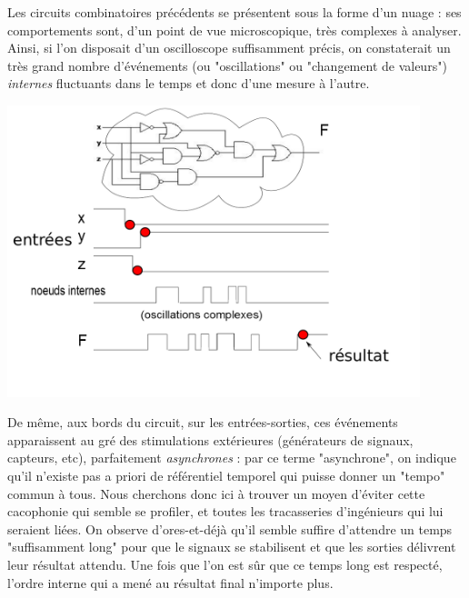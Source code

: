 Les circuits combinatoires précédents se présentent sous la forme d'un nuage : ses comportements sont, d'un point de vue microscopique, très complexes à analyser. Ainsi, si l'on
disposait d'un oscilloscope suffisamment précis, on constaterait un très grand nombre d'événements (ou "oscillations" ou "changement de valeurs") {\it internes} fluctuants dans le temps et donc d'une mesure à l'autre.
\begin{center}
  \includegraphics[width=12cm]{./figures/cloud-complexe-events.png}
\end{center}


De même, aux bords du circuit, sur les entrées-sorties, ces événements apparaissent au gré des stimulations extérieures (générateurs de signaux, capteurs, etc), parfaitement {\it asynchrones} : par ce terme
"asynchrone", on indique qu'il n'existe pas a priori de référentiel temporel qui puisse donner un "tempo" commun à tous.
Nous cherchons donc ici à trouver un moyen d'éviter cette cacophonie qui semble se profiler, et toutes les tracasseries d'ingénieurs qui lui
seraient liées. On observe d'ores-et-déjà qu'il semble suffire d'attendre un temps "suffisamment long" pour que le signaux se stabilisent et que les
sorties délivrent leur résultat attendu. Une fois que l'on est sûr que ce temps long est respecté, l'ordre interne qui a mené au résultat final n'importe plus.

